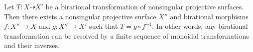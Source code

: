 Let $T: X \dashrightarrow X'$ be a birational transformation of nonsingular projective surfaces. Then there exists a nonsingular projective surface $X''$ and birational morphisms $f: X'' \to X$ and $g: X'' \to X'$ such that $T = g \circ f^{-1}$. In other words, any birational transformation can be resolved by a finite sequence of monoidal transformations and their inverses.
